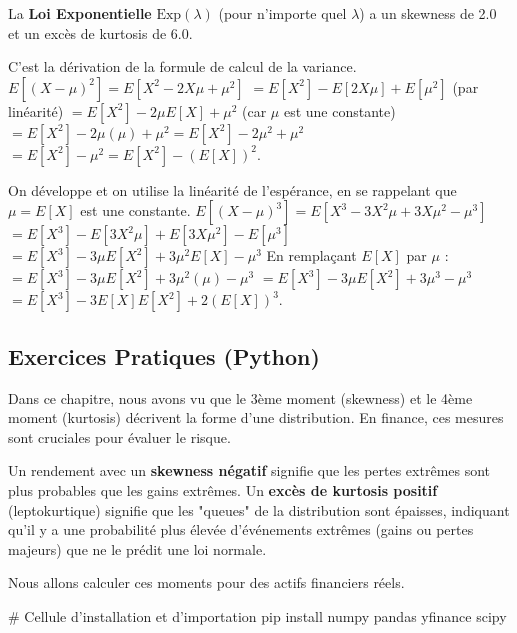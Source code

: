 \begin{correctionbox}
La \textbf{Loi Exponentielle} $\text{Exp}(\lambda)$ (pour n'importe quel $\lambda$) a un skewness de 2.0 et un excès de kurtosis de 6.0.
\end{correctionbox}

\begin{correctionbox}
C'est la dérivation de la formule de calcul de la variance.
$E[(X-\mu)^2] = E[X^2 - 2X\mu + \mu^2]$
$= E[X^2] - E[2X\mu] + E[\mu^2]$ (par linéarité)
$= E[X^2] - 2\mu E[X] + \mu^2$ (car $\mu$ est une constante)
$= E[X^2] - 2\mu(\mu) + \mu^2 = E[X^2] - 2\mu^2 + \mu^2$
$= E[X^2] - \mu^2 = E[X^2] - (E[X])^2$.
\end{correctionbox}

\begin{correctionbox}
On développe et on utilise la linéarité de l'espérance, en se rappelant que $\mu=E[X]$ est une constante.
$E[(X-\mu)^3] = E[X^3 - 3X^2\mu + 3X\mu^2 - \mu^3]$
$= E[X^3] - E[3X^2\mu] + E[3X\mu^2] - E[\mu^3]$
$= E[X^3] - 3\mu E[X^2] + 3\mu^2 E[X] - \mu^3$
En remplaçant $E[X]$ par $\mu$ :
$= E[X^3] - 3\mu E[X^2] + 3\mu^2(\mu) - \mu^3$
$= E[X^3] - 3\mu E[X^2] + 3\mu^3 - \mu^3$
$= E[X^3] - 3E[X]E[X^2] + 2(E[X])^3$.
\end{correctionbox}

\subsection{Exercices Pratiques (Python)}

Dans ce chapitre, nous avons vu que le 3ème moment (skewness) et le 4ème moment (kurtosis) décrivent la forme d'une distribution. En finance, ces mesures sont cruciales pour évaluer le risque.

Un rendement avec un \textbf{skewness négatif} signifie que les pertes extrêmes sont plus probables que les gains extrêmes. Un \textbf{excès de kurtosis positif} (leptokurtique) signifie que les "queues" de la distribution sont épaisses, indiquant qu'il y a une probabilité plus élevée d'événements extrêmes (gains ou pertes majeurs) que ne le prédit une loi normale.

Nous allons calculer ces moments pour des actifs financiers réels.

\begin{codecell}
# Cellule d'installation et d'importation
pip install numpy pandas yfinance scipy
\end{codecell}

